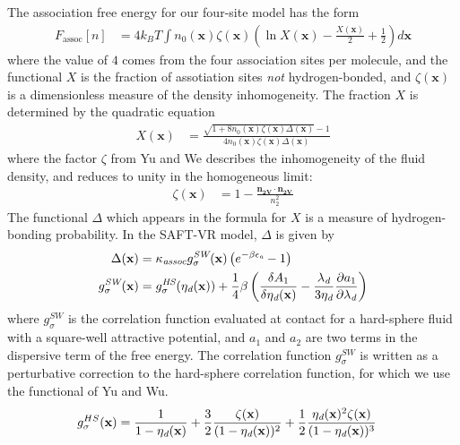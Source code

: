 \documentclass[letterpaper,twocolumn,amsmath,amssymb,prb]{revtex4-1}
\newcommand{\xx}{\textbf{x}}
\begin{document}
The association free energy for our four-site model has the form
\begin{align}
  F_\text{assoc}[n] &= 4 k_BT \int n_0(\xx)\zeta(\xx)
  \left(\ln X(\xx) - \frac{X(\xx)}{2} + \frac12\right) d\xx
\end{align}
where the value of $4$ comes from the four association sites per
molecule, and the functional $X$ is the fraction of assotiation sites
\emph{not} hydrogen-bonded, and $\zeta(\xx)$ is a dimensionless
measure of the density inhomogeneity.  The fraction $X$ is determined
by the quadratic equation
\begin{align}
  X(\xx) &= \frac{\sqrt{1 + 8n_0(\xx)\zeta(\xx)\Delta(\xx)} - 1}
  {4 n_0(\xx)\zeta(\xx)\Delta(\xx)}
\end{align}
where the factor $\zeta$ from
Yu and We\cite{yu2002fmt-dft-inhomogeneous-associating,
  fu2005vapor-liquid-dft} describes the inhomogeneity of the fluid
density, and reduces to unity in the homogeneous limit:
\begin{align}
  \zeta(\xx) &= 1 - \frac{\mathbf{n_{2V}}\cdot\mathbf{n_{2V}}}{n_2^2}
\end{align}
The functional $\Delta$ which appears in the formula for $X$ is a
measure of hydrogen-bonding probability.  In the SAFT-VR
model\cite{gil-villegas-1997-SAFT-VR}, $\Delta$ is given by
\begin{align}
  \Delta(\xx) &= \kappa_\textit{assoc} g^\textit{SW}_\sigma(\xx)
  \left(e^{-\beta\epsilonassoc} - 1\right) \\
  g^\textit{SW}_\sigma(\xx) &= g^\textit{HS}_\sigma(\etadisp(\xx)) +
  \frac{1}{4}\beta\left(\frac{\delta A_1}{\delta \etadisp(\xx)} -
  \frac{\lambdadisp}{3 \etadisp}\frac{\partial a_1}{\partial \lambdadisp}\right)
\end{align}
where $g^\textit{SW}_\sigma$ is the correlation function evaluated at
contact for a hard-sphere fluid with a square-well attractive
potential, and $a_1$ and $a_2$ are two terms in the dispersive term of
the free energy.  The correlation function $g^\textit{SW}_\sigma$ is
written as a perturbative correction to the hard-sphere correlation
function, for which we use the functional of Yu and
Wu.\cite{yu2002fmt-dft-inhomogeneous-associating}
\begin{align}
  g_\sigma^{HS}(\xx) &= \frac{1}{1-\etadisp(\xx)}
  +\frac32\frac{\zeta(\xx)}{(1-\etadisp(\xx))^2}
  + \frac12\frac{\etadisp(\xx)^2\zeta(\xx)}{(1-\etadisp(\xx))^3}
\end{align}
\end{document}
